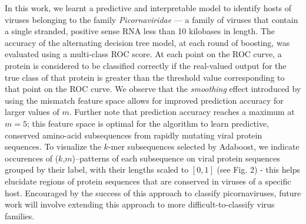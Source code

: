 In this work, we learnt a predictive and interpretable model to identify hosts of viruses 
belonging to the family \emph{Picornaviridae} --- a family of viruses that contain a single 
stranded, positive sense RNA less than 10 kilobases in length. The accuracy of the alternating 
decision tree model, at each round of boosting, was evaluated using a multi-class ROC score.
At each point on the ROC curve, a protein is considered to be classified correctly if the 
real-valued output for the true class of that protein is greater than the threshold value
corresponding to that point on the ROC curve. We observe that the \emph{smoothing} effect introduced
by using the mismatch feature space allows for improved prediction accuracy for larger
values of $m$. Further note that prediction accuracy reaches a maximum at $m=5$; this feature space is
optimal for the algorithm to learn predictive, conserved amino-acid subsequences from rapidly 
mutating viral protein sequences. To visualize the $k$-mer subsequences selected by 
Adaboost, we indicate occurences of ($k$,$m$)--patterns of each subsequence on viral protein 
sequences grouped by their label, with their lengths scaled to $[0,1]$ (see Fig. 2) - this helps 
elucidate regions of protein sequences that are conserved in viruses of a specific host. Encouraged 
by the success of this approach to classify picornaviruses, future work will involve extending 
this approach to more difficult-to-classify virus families.

\begin{figure}
\begin{minipage}[t]{0.5\linewidth}
\caption{\small{}}
\label{auc}
\end{minipage}\quad
\begin{minipage}[t]{0.5\linewidth}
\caption{\small{}}
\label{kmers}
\end{minipage}
\end{figure}


